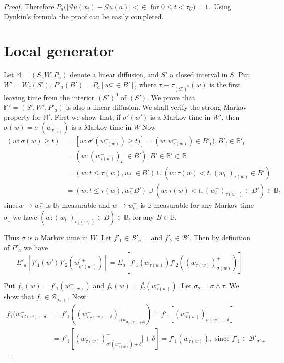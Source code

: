\begin{proof}
Therefore $P_a (|\mathscr{G} u(x_t) - \mathscr{G} u(a)| < \in $ for $0
\leq t < \tau_U) = 1$.~Using Dynkin's formula the proof can be easily
completed. 

\section{Local generator}\label{chap6-sec3} %

Let $\mathbb{M} = (S, W, P_a)$ denote a linear diffusion, and $S'$ a
closed interval in $S$. Put $W' = W_c (S')$, $P'_a (B') = P_a
[w^{-}_{\tau}\in B']$,
where $\tau \equiv \tau_{(S')^0} (w)$ is the first leaving time from
the interior $(S')^0$ of $(S')$. We prove that $\mathbb{M}' = (S', W',
P'_a)$ is also a linear diffusion. We shall verify the strong Markov
property for $\mathbb{M}'$. First we show that, if $\sigma '(w')$ is a
Markov time in $W'$, then $\sigma (w) = \sigma^{'}
(w^-_{\tau_{(w)}})$ is a Markov time in $W$ Now 
{\fontsize{10pt}{12pt}\selectfont
\begin{align*}
(w: \sigma (w) \geq t) &= [w : \sigma'(w^{-}_{\tau(w)}) \geq t)] = (w :
  w^-_{\tau (w)}) \in B'_t), B'_t \in \mathbb{B}'_t\\ 
  &= (w : (w^-_{\tau (w)})^-_t \in B'), B' \in \mathbb{B}' \subset \mathbb{B} \\
  &= (w : t \leq \tau (w), w^-_t \in B' ) \cup (w : \tau (w) < t,
  (w^-_t)^-_{\tau (w)} \in B')\\ 
  &= (w : t \leq \tau (w), w^-_t B') \cup (w: \tau (w) < t,
  (w^-_t)_{\tau (w^-_t)} \in B') \in \mathbb{B}_t 
\end{align*}}\relax
since\pageoriginale $w \to w^-_t$ is $\mathbb{B}_t$-measurable and $w \to
w^-_{\sigma _1}$ is $\mathbb{B}$-measurable for any Markov time
$\sigma_1$ we have $(w: (w^-_t)^-_{\sigma_1 (w^-_t)}\in B) \in
\mathbb{B}_t$ for any $B \in \mathbb{B}$. 

Thus $\sigma$ is a Markov time in $W$. Let $f'_1 \in
\mathscr{B}'_{\sigma' +}$ and $f'_2 \in \mathscr{B}'$. Then by
definition of $P'_a$ we have 
$$
E'_a\left[ f'_1 (w') f'_2 (w^{'+}_{\sigma'(w')})\right] = E_a \left[
  f'_1 (w^{-}_{\tau(w)})f'_2 ((w^-_{\tau(w)})^+_{\sigma(w)})\right] 
$$

Put $f_1(w)= f'_1 (w^-_{\tau(w)})$ and $f_2(w)= f^1_2
(w^-_{\tau(w)})$. Let $\sigma_2= \sigma \wedge \tau$. We show that
$f_1 \in \mathscr{B}_{\sigma_2 +}$. Now 
\begin{align*}
f_1 (w^-_{\sigma 2(w)+\delta} & = f'_1 ((w^-_{\sigma_2
    (w)+\delta})^-_{\tau (w^-_{\sigma_2 (w)+\delta)}}) = f'_1\left
  [(w^-_{\tau (w)})^-_{\sigma (w)+ \delta }\right]\\  
  & = f'_1 \left[ (w^-_{\tau (w)})^-_{\sigma' (w^-_{\tau(w)})+\delta}] +
    \delta \right] = f'_1 (w^-_{\tau (w)}),\text{ since }f'_1 \in
  \mathscr{B}'_{\sigma ' +}  
\end{align*}


\end{proof}
